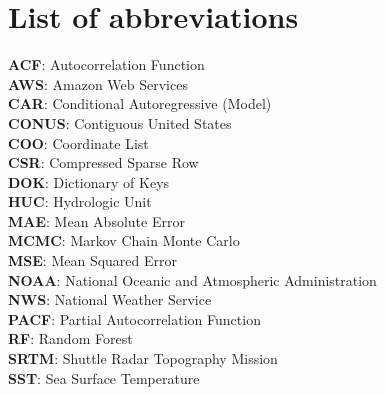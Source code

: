 \documentclass{svjour3}
\begin{document}
\section*{List of abbreviations}
\textbf{ACF}: Autocorrelation Function \\
\textbf{AWS}: Amazon Web Services \\
\textbf{CAR}: Conditional Autoregressive (Model) \\
\textbf{CONUS}: Contiguous United States \\
\textbf{COO}: Coordinate List \\
\textbf{CSR}: Compressed Sparse Row \\
\textbf{DOK}: Dictionary of Keys \\
\textbf{HUC}: Hydrologic Unit \\ 
\textbf{MAE}: Mean Absolute Error \\
\textbf{MCMC}: Markov Chain Monte Carlo \\ 
\textbf{MSE}: Mean Squared Error \\ 
\textbf{NOAA}: National Oceanic and Atmospheric Administration\\
\textbf{NWS}: National Weather Service \\ 
\textbf{PACF}: Partial Autocorrelation Function \\
\textbf{RF}: Random Forest \\ 
\textbf{SRTM}: Shuttle Radar Topography Mission \\
\textbf{SST}: Sea Surface Temperature  \\

\newpage
\end{document}
